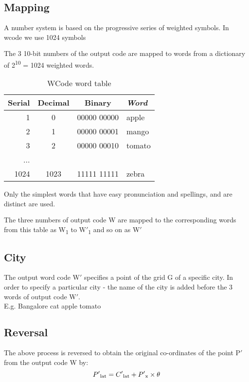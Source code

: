 \documentclass[conference]{IEEEtran}
\begin{document}
\subsection{Mapping}

A number system is based on the progressive series of weighted symbols.
In wcode we use 1024 symbols

The 3 10-bit numbers of the output code are mapped to words from a dictionary of 2\textsuperscript{10} = 1024 weighted words.
\begin{table}[h!]
\caption{WCode word table} \begin{center}
\bgroup
\def\arraystretch{1.4}%
\begin{tabular}{r|c|c|l}
\textbf{Serial} & \textbf{Decimal} & \textbf{Binary} & \textbf{\textit{Word}} \\
\hline
1 & 0 & 00000 00000 & apple\\
\hline
2 & 1 & 00000 00001 & mango \\
\hline
3 & 2 & 00000 00010 & tomato \\
... & & & \\
1024 & 1023 & 11111 11111 & zebra
\end{tabular}
\egroup
\end{center} \end{table}

Only the simplest words that have easy pronunciation and spellings, and are distinct are used.

The three numbers of output code W are mapped to the corresponding words from this table as W\textsubscript{1} to W$'$\textsubscript{1} and so on as W$'$
\subsection{City}
The output word code W$'$ specifies a point of the grid G of a specific city. In order to specify a particular city - the name of the city is added before the 3 words of output code W$'$.\\

E.g. Bangalore cat apple tomato

\subsection{Reversal}\label{AA}
The above process is reversed to obtain the original co-ordinates of the point P$'$ from the output code W by:
\begin{equation}P'\textsubscript{lat} = C'\textsubscript{lat} +  P'\textsubscript{x} \times {\theta}\end{equation}
\end{document}
